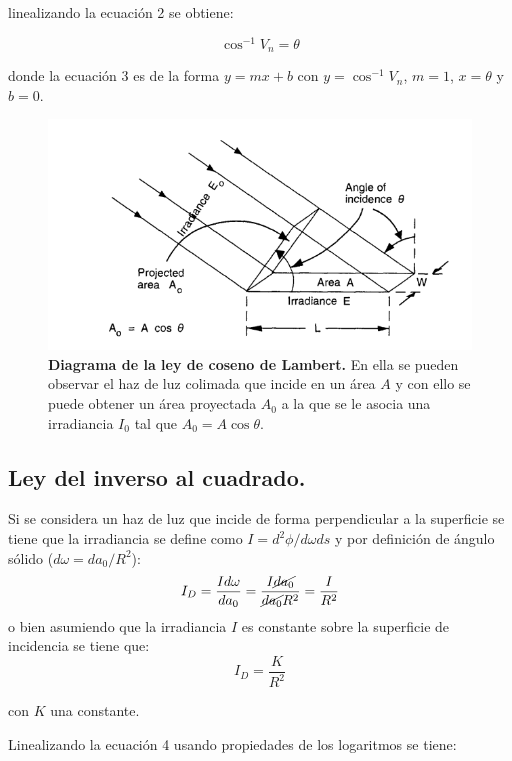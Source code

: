 \documentclass[DIV=calc, paper=a4, fontsize=11pt]{scrartcl}
\begin{document}
linealizando la ecuación 2 se obtiene:

\begin{equation}
    \cos^{-1}{V_n} = \theta
\end{equation}

donde la ecuación 3 es de la forma $y=mx+b$ con $y=\cos^{-1}{V_n}$, $m=1$, $x=\theta$ y $b=0$.

\begin{figure}[h!]
    \centering
    \includegraphics[scale=0.5]{diagrama lambert.PNG}
    \caption{\textbf{Diagrama de la ley de coseno de Lambert.} En ella se pueden observar el haz de luz colimada que incide en un área $A$ y con ello se puede obtener un área proyectada $A_{0}$ a la que se le asocia una irradiancia $I_{0}$ tal que $A_{0}=A\cos{\theta}$\cite{book}.}
\end{figure}

\subsection*{\textcolor{carmine}{Ley del inverso al cuadrado.}}
Si se considera un haz de luz que incide de forma perpendicular a la superficie se tiene que la irradiancia se define como $I= d^2\phi/d\omega ds$ y por definición de ángulo sólido ($d\omega = da_0/R^2$):
\begin{equation*}
    I_D = \frac{Id \omega}{da_0 } = \frac{I \cancel{da_0}}{\cancel{da_0} R^2} = \frac{I}{R^2}
\end{equation*}o bien asumiendo que la irradiancia $I$ es constante sobre la superficie de incidencia se tiene que:
\begin{equation}
    I_D = \frac{K}{R^2}
\end{equation}

con $K$ una constante\cite{book}.

Linealizando la ecuación 4 usando propiedades de los logaritmos se tiene:
\end{document}
